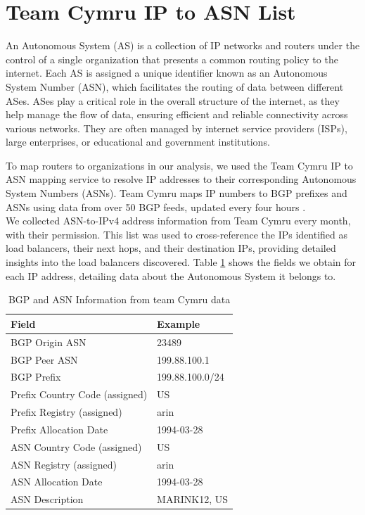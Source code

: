 \documentclass[12pt]{cwru_thesis}
\begin{document}
\section{Team Cymru IP to ASN List}

An Autonomous System (AS) is a collection of IP networks and routers under the control of a single organization that presents a common routing policy to the internet. Each AS is assigned a unique identifier known as an Autonomous System Number (ASN), which facilitates the routing of data between different ASes. ASes play a critical role in the overall structure of the internet, as they help manage the flow of data, ensuring efficient and reliable connectivity across various networks. They are often managed by internet service providers (ISPs), large enterprises, or educational and government institutions.

To map routers to organizations in our analysis, we used the Team Cymru IP to ASN mapping service to resolve IP addresses to their corresponding Autonomous System Numbers (ASNs). Team Cymru maps IP numbers to BGP prefixes and ASNs using data from over 50 BGP feeds, updated every four hours  \cite{teamcymru2023ipasn}.\\  


 
 We collected ASN-to-IPv4 address information from Team Cymru every month, with their permission. This list was used to cross-reference the IPs identified as load balancers, their next hops, and their destination IPs, providing detailed insights into the load balancers discovered. Table \ref{tab:bgp_asn_info} shows the fields we obtain for each IP address, detailing data about  the Autonomous System it belongs to. 

\begin{table}[h]
    \centering
    \begin{tabular}{|l|l|}
        \hline
        \textbf{Field} & \textbf{Example} \\
        \hline
        BGP Origin ASN & 23489 \\
        \hline
        BGP Peer ASN & 199.88.100.1 \\
        \hline
        BGP Prefix & 199.88.100.0/24 \\
        \hline
        Prefix Country Code (assigned) & US \\
        \hline
        Prefix Registry (assigned) & arin \\
        \hline
        Prefix Allocation Date & 1994-03-28 \\
        \hline
        ASN Country Code (assigned) & US \\
        \hline
        ASN Registry (assigned) & arin \\
        \hline
        ASN Allocation Date & 1994-03-28 \\
        \hline
        ASN Description & MARINK12, US \\
        \hline
    \end{tabular}
    \caption{BGP and ASN Information from team Cymru data}
    \label{tab:bgp_asn_info}
\end{table}
\end{document}
